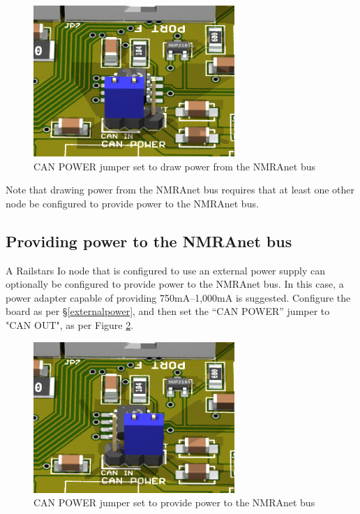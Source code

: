 \documentclass[12pt]{book}
\begin{document}
\begin{figure}[htbp]
\begin{center}
\includegraphics[width=3in]{images/IoCANPowerIn.png}
\caption{CAN POWER jumper set to draw power from the NMRAnet bus}
\label{CANIN}
\end{center}
\end{figure}

Note that drawing power from the NMRAnet bus requires that at least one other node be configured to provide power to the NMRAnet bus.

\subsection{Providing power to the NMRAnet bus}

A Railstars Io node that is configured to use an external power supply can optionally be configured to provide power to the NMRAnet bus. In this case, a power adapter capable of providing 750mA--1,000mA is suggested. Configure the board as per \S\ref{externalpower}, and then set the ``CAN POWER'' jumper to "CAN OUT", as per Figure \ref{CANOUT}.

\begin{figure}[htbp]
\begin{center}
\includegraphics[width=3in]{images/IoCANPowerOut.png}
\caption{CAN POWER jumper set to provide power to the NMRAnet bus}
\label{CANOUT}
\end{center}
\end{figure}
\end{document}
